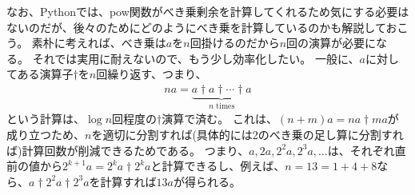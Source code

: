 なお、Pythonでは、pow関数がべき乗剰余を計算してくれるため気にする必要はないのだが、後々のためにどのようにべき乗を計算しているのかも解説しておこう。
素朴に考えれば、べき乗は$a$を$n$回掛けるのだから$n$回の演算が必要になる。
それでは実用に耐えないので、もう少し効率化したい。
一般に、$a$に対してある演算子$\dagger$を$n$回繰り返す、つまり、
\begin{align*}
na = \underbrace{a \dagger a \dagger \cdots \dagger a }_{n\text{ times}}
\end{align*}
という計算は、$\log{n}$回程度の$\dagger$演算で済む。
これは、$(n+m)a = na \dagger ma$が成り立つため、$n$を適切に分割すれば(具体的には2のべき乗の足し算に分割すれば)計算回数が削減できるためである。
つまり、$a, 2a, 2^2a, 2^3a, \ldots$は、それぞれ直前の値から$2^{k+1}a = 2^ka \dagger 2^ka$と計算できるし、例えば、$n=13=1+4+8$なら、$a \dagger 2^2a \dagger 2^3a$を計算すれば$13a$が得られる。

